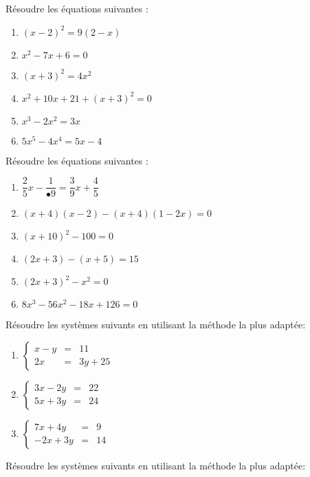 \begin{exercice}
Résoudre les équations suivantes :
\begin{enumerate}
\item $(x-2)^2=9(2-x)$
\item $x^2-7x+6=0$
\item $(x+3)^2=4x^2$
\item $x^2+10x+21+(x+3)^2=0$
\item $x^3-2x^2=3x$
\item $5x^5-4x^4=5x-4$
\end{enumerate}

\begin{exercice}
Résoudre les équations suivantes :
\begin{enumerate}
\item $\dfrac{2}{5}x-\dfrac{1}{•9}=\dfrac{3}{9}x+\dfrac{4}{5}$
\item $(x+4)(x-2)-(x+4)(1-2x)=0$
\item $(x+10)^2-100=0$
\item $(2x+3)-(x+5)=15$
\item $(2x+3)^2-x^2=0$
\item $8x^3-56x^2-18x+126=0$
\end{enumerate}


\begin{exercice}
Résoudre les systèmes suivants en utilisant la méthode la plus adaptée:

\begin{enumerate}

 \item $\left\lbrace\begin{array}{lll}
x-y&=& 11\\
2x&=& 3y+25
\end{array}\right.$

\item $\left\lbrace\begin{array}{lll}
 3x-2y&=&22 \\
 5x+3y&=&24
\end{array}\right.$

\item $\left\lbrace\begin{array}{lll}
 7x+4y&=&9 \\
 -2x+3y&=&14
\end{array}\right.$
\end{enumerate}
\end{exercice}


\begin{exercice}
Résoudre les systèmes suivants en utilisant la méthode la plus adaptée:


\end{exercice}
\end{exercice}
\end{exercice}
